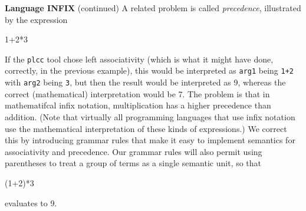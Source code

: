 \begin{minipage}[t]{\sw}
\slidenumber
\LARGE
{\bf Language INFIX} (continued)\exx
A related problem is called {\em precedence},
illustrated by the expression
\begin{qv}
1+2*3
\end{qv}
If the \verb'plcc' tool chose left associativity
(which is what it might have done, correctly, in the previous example),
this would be interpreted as \verb'arg1' being \verb'1+2'
with \verb'arg2' being \verb'3',
but then the result would be interpreted as 9,
whereas the correct (mathematical) interpretation would be 7.
The problem is that in mathematifcal infix notation,
multiplication has a higher precedence than addition.
(Note that virtually all programming languages that use infix notation
use the mathematical interpretation of these kinds of expressions.)\exx
We correct this by introducing grammar rules
that make it easy to implement semantics for associativity and precedence.
Our grammar rules will also permit using parentheses
to treat a group of terms as a single semantic unit,
so that
\begin{qv}
(1+2)*3
\end{qv}
evaluates to 9.
\end{minipage}
